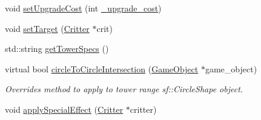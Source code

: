 \begin{DoxyCompactItemize}
void \hyperlink{class_tower_af0366aa989249fc2d8254b967dd2f9aa}{set\+Upgrade\+Cost} (int \hyperlink{class_tower_ade771f89ab1aecb165efb74592e71261}{\+\_\+upgrade\+\_\+cost})
\item 
void \hyperlink{class_tower_ac8251f835bd2a94690d1c6e4f1e18d93}{set\+Target} (\hyperlink{class_critter}{Critter} $\ast$crit)
\item 
std\+::string \hyperlink{class_tower_a2427fab36824f8ec98273cb5e563e0c9}{get\+Tower\+Specs} ()
\item 
virtual bool \hyperlink{class_tower_a518ff249dec05cdd026a830d845abfd2}{circle\+To\+Circle\+Intersection} (\hyperlink{class_game_object}{Game\+Object} $\ast$game\+\_\+object)
\begin{DoxyCompactList}\small\item\em Overrides method to apply to tower range sf\+::\+Circle\+Shape object. \end{DoxyCompactList}\item 
void \hyperlink{class_tower_a7df1e896cdd5cdf7cc2169d6d4f9a6cf}{apply\+Special\+Effect} (\hyperlink{class_critter}{Critter} $\ast$critter)
\end{DoxyCompactItemize}
